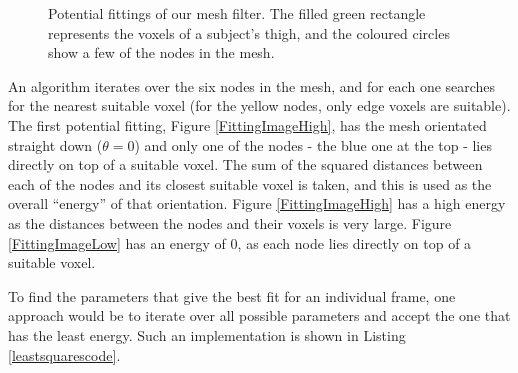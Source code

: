\begin{figure}[tb]
	\centering
	\qquad
	\caption{Potential fittings of our mesh filter.
		The filled green rectangle represents the voxels of a subject's thigh,
		and the coloured circles show a few of the nodes in the mesh.}
	\label{FittingImages}
\end{figure}

An algorithm iterates over the six nodes in the mesh, and for each one searches for the nearest suitable voxel (for the yellow nodes, only edge voxels are suitable).
The first potential fitting, Figure \ref{FittingImageHigh}, has the mesh orientated straight down ($\theta = 0$) and only one of the nodes - the blue one at the top - lies directly on top of a suitable voxel.
The sum of the squared distances between each of the nodes and its closest suitable voxel is taken, and this is used as the overall ``energy'' of that orientation.
Figure \ref{FittingImageHigh} has a high energy as the distances between the nodes and their voxels is very large.
Figure \ref{FittingImageLow} has an energy of $0$, as each node lies directly on top of a suitable voxel.

To find the parameters that give the best fit for an individual frame, one approach would be to iterate over all possible parameters and accept the one that has the least energy.
Such an implementation is shown in Listing \ref{leastsquarescode}.

